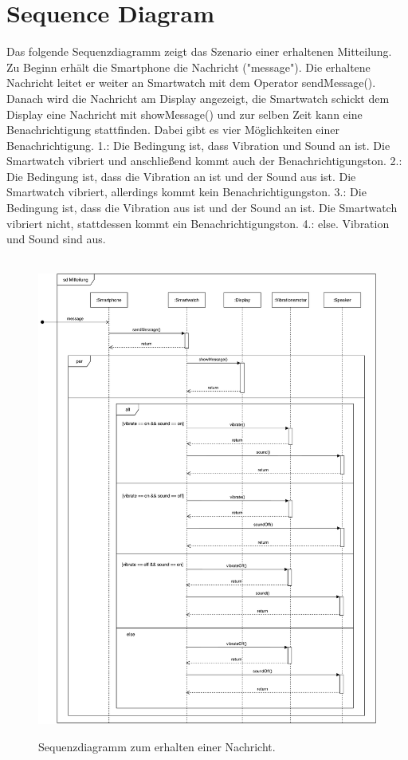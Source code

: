 

\section{Sequence Diagram}

Das folgende Sequenzdiagramm zeigt das Szenario einer erhaltenen Mitteilung. Zu Beginn erhält die Smartphone die Nachricht ("message"). Die erhaltene Nachricht leitet er weiter an Smartwatch mit dem Operator sendMessage(). Danach wird die Nachricht am Display angezeigt, die Smartwatch schickt dem Display eine Nachricht mit showMessage() und zur selben Zeit kann eine Benachrichtigung stattfinden. Dabei gibt es vier Möglichkeiten einer Benachrichtigung.
1.: Die Bedingung ist, dass Vibration und Sound an ist. Die Smartwatch vibriert und anschließend kommt auch der Benachrichtigungston.
2.: Die Bedingung ist, dass die Vibration an ist und der Sound aus ist. Die Smartwatch vibriert, allerdings kommt kein Benachrichtigungston.
3.: Die Bedingung ist, dass die Vibration aus ist und der Sound an ist. Die Smartwatch vibriert nicht, stattdessen kommt ein Benachrichtigungston.
4.: else. Vibration und Sound sind aus.

\begin{figure}[H]
\centering\
\includegraphics[width=\textwidth]{img/seqMessage}
\caption{Sequenzdiagramm zum erhalten einer Nachricht.}\label{fig:seqMessage}
\end{figure}
